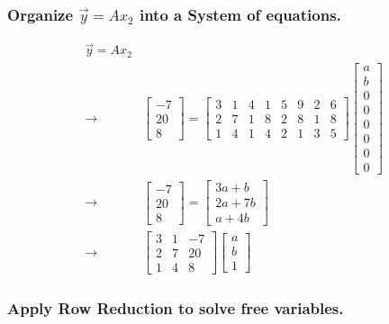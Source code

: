 \documentclass[11pt]{article}
\begin{document}
\subsubsection{Organize \(\vec y = A x_2\) into a System of equations.}
\label{sec:orgc952f84}
\begin{equation}
\begin{split}
\vec y = A x_2 & \\
\to & \begin{bmatrix} -7\\ 20\\ 8 \end{bmatrix} = \begin{bmatrix} 3 & 1 & 4 & 1 & 5 & 9 & 2 & 6\\ 2 & 7 & 1 & 8 & 2 & 8 &
1 & 8\\ 1 & 4 & 1 & 4 & 2 & 1 & 3 & 5 \end{bmatrix} \begin{bmatrix}
a\\ b\\ 0\\ 0\\ 0\\ 0\\ 0\\ 0
\end{bmatrix}\\
\to & \begin{bmatrix}
-7\\ 20\\ 8
\end{bmatrix} = \begin{bmatrix}
3a + b\\
2a + 7b\\
a + 4b
\end{bmatrix}\\
\to & \begin{bmatrix}
3 & 1 & -7\\
2 & 7 & 20\\
1 & 4 & 8
\end{bmatrix} \begin{bmatrix}
a\\ b\\ 1
\end{bmatrix}
\end{split}
\end{equation}

\subsubsection{Apply Row Reduction to solve free variables.}
\label{sec:org0a01ff6}
\end{document}
